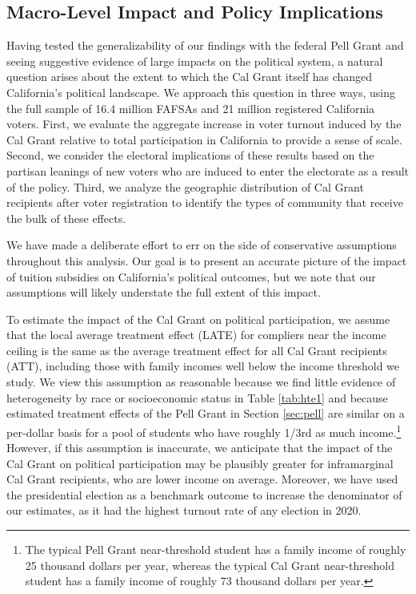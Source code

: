 \documentclass[12pt,letterpaper,oneside]{book}
\begin{document}
\subsection{Macro-Level Impact and Policy Implications}\label{sec:policy}
Having tested the generalizability of our findings with the federal Pell Grant and seeing suggestive evidence of large impacts on the political system, a natural question arises about the extent to which the Cal Grant itself has changed California's political landscape. We approach this question in three ways, using the full sample of 16.4 million FAFSAs and 21 million registered California voters. First, we evaluate the aggregate increase in voter turnout induced by the Cal Grant relative to total participation in California to provide a sense of scale. Second, we consider the electoral implications of these results based on the partisan leanings of new voters who are induced to enter the electorate as a result of the policy. Third, we analyze the geographic distribution of Cal Grant recipients after voter registration to identify the types of community that receive the bulk of these effects.

We have made a deliberate effort to err on the side of conservative assumptions throughout this analysis. Our goal is to present an accurate picture of the impact of tuition subsidies on California's political outcomes, but we note that our assumptions will likely understate the full extent of this impact.

To estimate the impact of the Cal Grant on political participation, we assume that the local average treatment effect (LATE) for compliers near the income ceiling is the same as the average treatment effect for all Cal Grant recipients (ATT), including those with family incomes well below the income threshold we study. We view this assumption as reasonable because we find little evidence of heterogeneity by race or socioeconomic status in Table \ref{tab:hte1} and because estimated treatment effects of the Pell Grant in Section \ref{sec:pell} are similar on a per-dollar basis for a pool of students who have roughly 1/3rd as much income.\footnote{The typical Pell Grant near-threshold student has a family income of roughly 25 thousand dollars per year, whereas the typical Cal Grant near-threshold student has a family income of roughly 73 thousand dollars per year.} However, if this assumption is inaccurate, we anticipate that the impact of the Cal Grant on political participation may be plausibly greater for inframarginal Cal Grant recipients, who are lower income on average. Moreover, we have used the presidential election as a benchmark outcome to increase the denominator of our estimates, as it had the highest turnout rate of any election in 2020.
\end{document}
